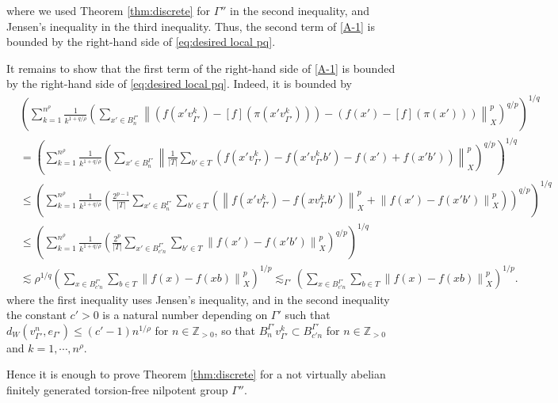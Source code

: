 \documentclass[11pt,reqno]{amsart}
\newcommand{\1}{\mathbf 1}
\begin{document}
where we used Theorem \ref{thm:discrete} for $\Gamma''$ in the second inequality, and Jensen's inequality in the third inequality. Thus, the second term of \eqref{A-1} is bounded by the right-hand side of \eqref{eq:desired local pq}.

It remains to show that the first term of the right-hand side of \eqref{A-1} is bounded by the right-hand side of \eqref{eq:desired local pq}. Indeed, it is bounded by
\begin{align*}
&\left(\sum_{k=1}^{n^\rho}\frac{1}{k^{1+q/\rho}}\left(\sum_{x'\in B^{\Gamma'}_n} \left\|\left(f\left(x'v_{\Gamma'}^k\right)-\left[f\right]\left(\pi\left(x'v_{\Gamma'}^k\right)\right)\right)-\left(f\left(x'\right)-\left[f\right]\left(\pi\left(x'\right)\right)\right)\right\|_X^p\right)^{q/p}\right)^{1/q}\\
&=\left(\sum_{k=1}^{n^\rho}\frac{1}{k^{1+q/\rho}}\left(\sum_{x'\in B^{\Gamma'}_n} \left\|\frac{1}{\left|T\right|}\sum_{b'\in T}\left(f\left(x'v_{\Gamma'}^k\right)-f\left(x'v_{\Gamma'}^kb'\right)-f\left(x'\right)+f\left(x'b'\right)\right)\right\|_X^p\right)^{q/p}\right)^{1/q}\\
&\le \left(\sum_{k=1}^{n^\rho}\frac{1}{k^{1+q/\rho}}\left(\frac{2^{p-1}}{\left|T\right|}\sum_{x'\in B^{\Gamma'}_n}\sum_{b'\in T} \left(\left\|f\left(x'v_{\Gamma'}^k\right)-f\left(xv_{\Gamma'}^kb'\right)\right\|_X^p+\left\|f\left(x'\right)-f\left(x'b'\right)\right\|_X^p\right)\right)^{q/p}\right)^{1/q}\\
&\le \left(\sum_{k=1}^{n^\rho}\frac{1}{k^{1+q/\rho}}\left(\frac{2^{p}}{\left|T\right|}\sum_{x'\in B^{\Gamma'}_{c'n}}\sum_{b'\in T} \left\|f\left(x'\right)-f\left(x'b'\right)\right\|_X^p\right)^{q/p}\right)^{1/q}\\
&\lesssim \rho^{1/q} \left(\sum_{x\in B^{\Gamma'}_{c'n}}\sum_{b\in T} \left\|f\left(x\right)-f\left(xb\right)\right\|_X^p\right)^{1/p}\lesssim_{\Gamma'}\left(\sum_{x\in B^{\Gamma'}_{c'n}}\sum_{b\in T} \left\|f\left(x\right)-f\left(xb\right)\right\|_X^p\right)^{1/p}.
\end{align*}
where the first inequality uses Jensen's inequality, and in the second inequality the constant $c'>0$ is a natural number depending on $\Gamma'$ such that $d_W\left(v^n_{\Gamma'},e_{\Gamma'}\right)\le \left(c'-1\right) n^{1/\rho}$ for $n\in \mathbb{Z}_{>0}$, so that $B^{\Gamma'}_nv_{\Gamma'}^k\subset B^{\Gamma'}_{c'n}$ for $n\in \mathbb{Z}_{>0}$ and $k=1,\cdots,n^\rho$.

Hence it is enough to prove Theorem \ref{thm:discrete} for a not virtually abelian finitely generated torsion-free nilpotent group $\Gamma''$.
\end{document}
